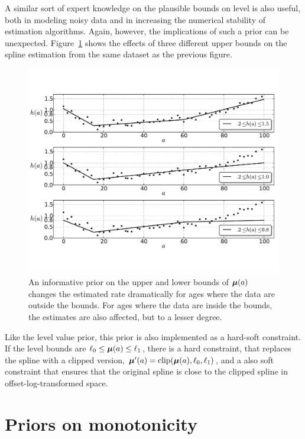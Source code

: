 A similar sort of expert knowledge on the plausible bounds on
level is also useful, both in modeling noisy data and in increasing
the numerical stability of estimation algorithms. Again, however, the
implications of such a prior can be unexpected.
Figure~\ref{level-bounds-priors} shows the effects of three different
upper bounds on the spline estimation from the same dataset as the
previous figure.

\begin{figure}[h]
\begin{center}
\includegraphics[width=\textwidth]{level_bound-smoothing-splines.pdf}
\caption{An informative prior on the upper and
lower bounds of $\boldsymbol{\mu}(a)$ changes the estimated rate dramatically for
ages where the data are outside the bounds. For ages where the data are
inside the bounds, the estimates are also affected, but to a lesser
degree.}
\label{level-bounds-priors}
\end{center}
\end{figure}



Like the level value prior, this prior is also implemented as a
hard-soft constraint.  If the level bounds are $\ell_0 \leq \boldsymbol{\mu}(a)
\leq \ell_1$, there is a hard constraint, that replaces the spline with a
clipped version, $\boldsymbol{\mu}'(a) = \operatorname{clip}(\boldsymbol{\mu}(a), \ell_0, \ell_1)$, and a
also soft constraint that ensures that the original spline is close to the clipped
spline in offset-log-transformed space.

\section{Priors on monotonicity}

